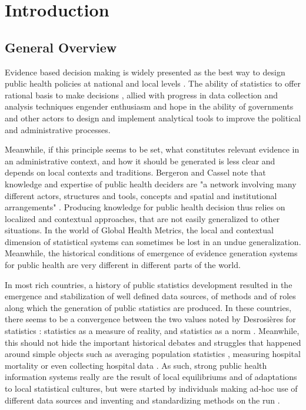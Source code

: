 \section{Introduction}

\subsection{General Overview}

Evidence based decision making is widely presented as the best way to design public health policies at national and local levels \citep{abou-zahr_health_2005,shibuya_health_2005,bambas_nolen_strengthening_2005,mutemwa_hmis_2006,boerma_public_2013}.
The ability of statistics to offer rational basis to make decisions \citep{desrosieres_politique_1993,porter_trust_1996},
allied with progress in data collection and analysis techniques engender enthusiasm and hope in the ability of governments and other actors to design and implement analytical tools to improve the political and administrative processes.

Meanwhile, if this principle seems to be set, what constitutes relevant evidence in an administrative context, and how it should be generated is less clear and depends on local contexts and traditions. Bergeron and Cassel note that knowledge and expertise of public health deciders are "a network involving many different actors, structures and tools, concepts and spatial and institutional arrangements" \citep{bergeron_savoirs_2014}. Producing knowledge for public health decision thus relies on localized and contextual approaches, that are not easily generalized to other situations. In the world of Global Health Metrics, the local and contextual dimension of statistical systems can sometimes be lost in an undue generalization. Meanwhile, the historical conditions of emergence of evidence generation systems for public health are very different in different parts of the world.

In most rich countries, a history of public statistics development resulted in the emergence and stabilization of well defined data sources, of methods and of roles along which the generation of public statistics are produced. In these countries, there seems to be a convergence between the two values noted by Desrosières for statistics : statistics as a measure of reality, and statistics as a norm \citep{desrosieres_administrator_1997,desrosieres_prouver_2014}. Meanwhile, this should not hide the important historical debates and struggles that happened around simple objects such as averaging population statistics \citep{desrosieres_politique_1993,porter_trust_1996}, measuring hospital mortality \citep{beyersmann_florence_2017} or even collecting hospital data \citep{chaperon_information_1988}. As such, strong public health information systems really are the result of local equilibriums and of adaptations to local statistical cultures, but were started by individuals making ad-hoc use of different data sources and inventing and standardizing methods on the run \citep{lecuyer_medecins_1987}.

